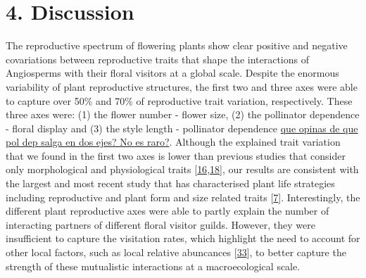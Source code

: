 \documentclass[
  12pt,
  a4paper,
]{article}
\begin{document}
\hypertarget{discussion}{%
\section{4. Discussion}\label{discussion}}

The reproductive spectrum of flowering plants show clear positive and negative covariations between reproductive traits that shape the interactions of Angiosperms with their floral visitors at a global scale. Despite the enormous variability of plant reproductive structures, the first two and three axes were able to capture over 50\% and 70\% of reproductive trait variation, respectively. These three axes were: (1) the flower number - flower size, (2) the pollinator dependence - floral display and (3) the style length - pollinator dependence \href{}{que opinas de que pol dep salga en dos ejes? No es raro?}. Although the explained trait variation that we found in the first two axes is lower than previous studies that consider only morphological and physiological traits {[}\protect\hyperlink{ref-diaz2016}{16},\protect\hyperlink{ref-carmona2021}{18}{]}, our results are consistent with the largest and most recent study that has characterised plant life strategies including reproductive and plant form and size related traits {[}\protect\hyperlink{ref-salguero2016}{7}{]}. Interestingly, the different plant reproductive axes were able to partly explain the number of interacting partners of different floral visitor guilds. However, they were insufficient to capture the visitation rates, which highlight the need to account for other local factors, such as local relative abuncances {[}\protect\hyperlink{ref-bartomeus2016}{33}{]}, to better capture the strength of these mutualistic interactions at a macroecological scale.
\end{document}
